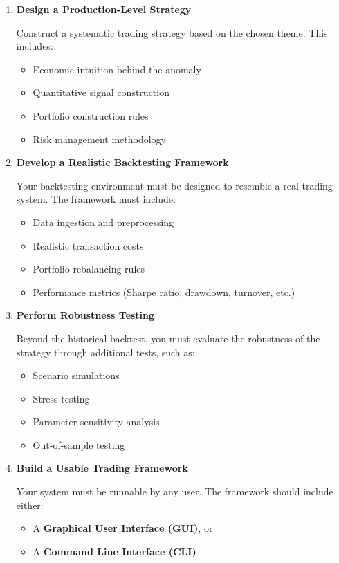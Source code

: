 \documentclass[12pt]{article}
\begin{document}
\begin{enumerate}[label=\arabic*.]

\item \textbf{Design a Production-Level Strategy}

Construct a systematic trading strategy based on the chosen theme. This
includes:

\begin{itemize}
\item Economic intuition behind the anomaly
\item Quantitative signal construction
\item Portfolio construction rules
\item Risk management methodology
\end{itemize}

\item \textbf{Develop a Realistic Backtesting Framework}

Your backtesting environment must be designed to resemble a real trading
system. The framework must include:

\begin{itemize}
\item Data ingestion and preprocessing
\item Realistic transaction costs
\item Portfolio rebalancing rules
\item Performance metrics (Sharpe ratio, drawdown, turnover, etc.)
\end{itemize}

\item \textbf{Perform Robustness Testing}

Beyond the historical backtest, you must evaluate the robustness of the
strategy through additional tests, such as:

\begin{itemize}
\item Scenario simulations
\item Stress testing
\item Parameter sensitivity analysis
\item Out-of-sample testing
\end{itemize}

\item \textbf{Build a Usable Trading Framework}

Your system must be runnable by any user. The framework should include
either:

\begin{itemize}
\item A \textbf{Graphical User Interface (GUI)}, or
\item A \textbf{Command Line Interface (CLI)}
\end{itemize}


\end{enumerate}
\end{document}
